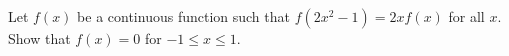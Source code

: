 Let $f(x)$ be a continuous function such that $f(2x^2-1)=2xf(x)$ for
all $x$.  Show that $f(x)=0$ for $-1\leq x\leq 1$.
